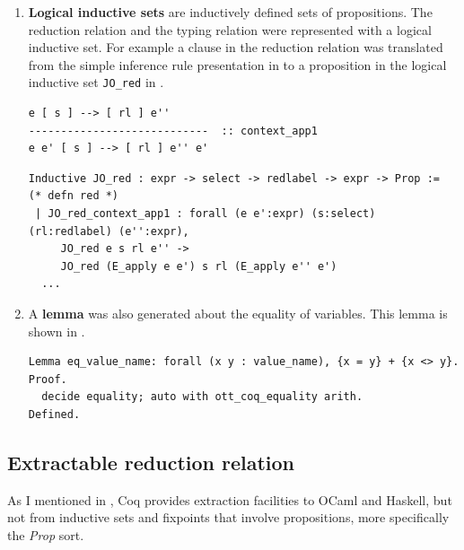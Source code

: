 \documentclass[12pt,twoside,notitlepage]{report}
\theoremstyle{plain}%
\theoremstyle{definition}
\theoremstyle{remark}
\begin{document}
\begin{enumerate}
{\begin{minipage}{\linewidth}
\end{minipage}	
}
\item{\textbf{Logical inductive sets} are inductively defined sets of propositions. The reduction relation and the typing relation were represented with a logical inductive set. For example a clause in the reduction relation was translated from the simple inference rule presentation in  to a proposition in the logical inductive set \verb|JO_red| in .


\begin{lstlisting}[language={Ott}, caption={Ott reduction relation example}, label={lst:ottcontextapp1}]
e [ s ] --> [ rl ] e''
----------------------------  :: context_app1
e e' [ s ] --> [ rl ] e'' e'
\end{lstlisting}


\begin{minipage}{\linewidth}

\begin{lstlisting}[language={Coq},caption={Coq reduction relation example}, label={lst:coqlogind}]
Inductive JO_red : expr -> select -> redlabel -> expr -> Prop :=    (* defn red *)
 | JO_red_context_app1 : forall (e e':expr) (s:select) (rl:redlabel) (e'':expr),
     JO_red e s rl e'' ->
     JO_red (E_apply e e') s rl (E_apply e'' e')
  ...
\end{lstlisting}

\end{minipage}	
}
\item{A \textbf{lemma} was also generated about the equality of variables. This lemma is shown in .


\begin{minipage}{\linewidth}

\begin{lstlisting}[language={Coq},caption={Coq variable equality lemma}, label={lst:coqeqlabel}]
Lemma eq_value_name: forall (x y : value_name), {x = y} + {x <> y}.
Proof.
  decide equality; auto with ott_coq_equality arith.
Defined.
\end{lstlisting}

\end{minipage}	

}
\end{enumerate} 
\subsection{Extractable reduction relation}
As I mentioned in , Coq provides extraction facilities to OCaml and Haskell, but not from inductive sets and fixpoints that involve propositions, more specifically the \textit{Prop} sort. 
\end{document}
